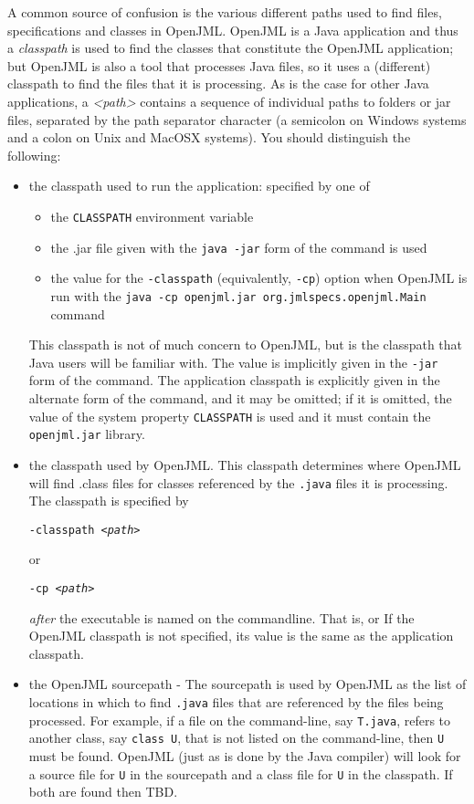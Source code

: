 A common source of confusion is the various different paths used to find files, specifications and classes in OpenJML.
OpenJML is a Java application and thus a {\it classpath} is used to find the classes that constitute the OpenJML application;
but OpenJML is also a tool that processes Java files, so it uses a (different) classpath to find the files that it is processing. 
As is the case for other Java applications, a {\it <path>} contains a sequence of individual paths to folders or jar files, separated
by the path separator character (a semicolon on Windows systems and a colon on Unix and MacOSX systems).
You should distinguish the following:
\begin{itemize}
\item the classpath used to run the application: specified by one of
\begin{itemize}\nospace
\item the {\tt CLASSPATH} environment variable
\item the .jar file given with the {\tt java -jar} form of the command is used
\item the value for the {\tt -classpath} (equivalently, {\tt -cp}) option when OpenJML is run with the
{\tt java -cp openjml.jar org.jmlspecs.openjml.Main} command
\end{itemize}
This classpath is not of much concern to OpenJML, but is the classpath that Java users will be familiar with.
The value is implicitly given in the {\tt -jar} form of the command. The application classpath is explicitly given in the alternate form of the command,
and it may be omitted; if it is omitted, the value of the system property {\tt CLASSPATH} is used and it must contain the {\tt openjml.jar} library.

\item the classpath used by OpenJML. This classpath determines where OpenJML will find .class files for classes 
referenced by the {\tt .java} files it is processing. The classpath is specified by\\
\centerline{\tt -classpath {\it <path>}}
or \\
\centerline{\tt -cp {\it <path>}}
{\it after} the executable is named on the commandline.  That is,
or
If the OpenJML classpath is not specified, its value is the same as the application classpath.

\item the OpenJML sourcepath - The sourcepath is used by OpenJML as the list of locations in which to find {\tt .java} 
files that are referenced by the files being processed. For example, if a file on the command-line, say {\tt T.java},
refers to another class, say {\tt class U}, that is not listed on the command-line, then {\tt U} must be found.  OpenJML (just as is done by the Java compiler) will look for a source file for {\tt U} in the sourcepath and a class file for {\tt U} in the classpath.
If both are found then TBD.


\end{itemize}
